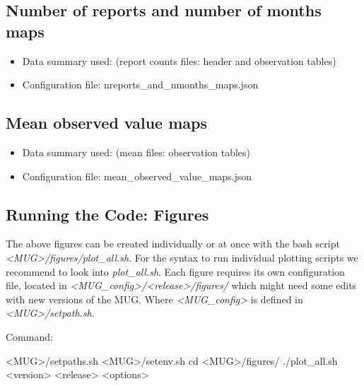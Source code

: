 \documentclass[letterpaper,10pt,english]{sphinxmanual}
\begin{document}
\subsection{Number of reports and number of months maps}
\label{\detokenize{index:number-of-reports-and-number-of-months-maps}}\begin{itemize}
\item {} 
Data summary used: {\hyperref[\detokenize{index:monthly-grids-um-section}]{}} (report counts files: header and observation tables)

\item {} 
Configuration file: nreports\_and\_nmonths\_maps.json

\end{itemize}


\subsection{Mean observed value maps}
\label{\detokenize{index:mean-observed-value-maps}}\begin{itemize}
\item {} 
Data summary used: {\hyperref[\detokenize{index:monthly-grids-um-section}]{}} (mean files: observation tables)

\item {} 
Configuration file: mean\_observed\_value\_maps.json

\end{itemize}


\subsection{Running the Code: Figures}
The above figures can be created individually or at once with the bash script \textit{<MUG>/figures/plot\_all.sh}. 
For the syntax to run individual plotting scripts we recommend to look into \textit{plot\_all.sh}.
Each figure requires its own configuration file, located in \textit{<MUG\_config>/<release>/figures/} which might need some edits with new versions of the MUG.
Where \textit{<MUG\_config>} is defined in \textit{<MUG>/setpath.sh}.

Command:
\begin{sphinxVerbatim}[commandchars=\\\{\}]
 <MUG>/setpaths.sh
 <MUG>/setenv.sh
cd <MUG>/figures/
./plot\_all.sh <version> <release> <options>
\end{sphinxVerbatim}
\end{document}
